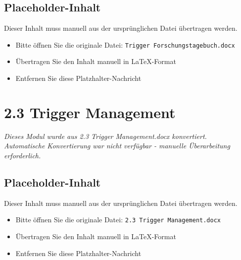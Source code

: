 
\subsection{Placeholder-Inhalt}

Dieser Inhalt muss manuell aus der ursprünglichen Datei übertragen werden.

\begin{itemize}
\item Bitte öffnen Sie die originale Datei: \texttt{Trigger Forschungstagebuch.docx}
\item Übertragen Sie den Inhalt manuell in LaTeX-Format
\item Entfernen Sie diese Platzhalter-Nachricht
\end{itemize}




\section{2.3 Trigger Management}
\label{sec:2.3-trigger-management}

\begin{center}
\textit{Dieses Modul wurde aus 2.3 Trigger Management.docx konvertiert.\\
Automatische Konvertierung war nicht verfügbar - manuelle Überarbeitung erforderlich.}
\end{center}


\subsection{Placeholder-Inhalt}

Dieser Inhalt muss manuell aus der ursprünglichen Datei übertragen werden.

\begin{itemize}
\item Bitte öffnen Sie die originale Datei: \texttt{2.3 Trigger Management.docx}
\item Übertragen Sie den Inhalt manuell in LaTeX-Format
\item Entfernen Sie diese Platzhalter-Nachricht
\end{itemize}

